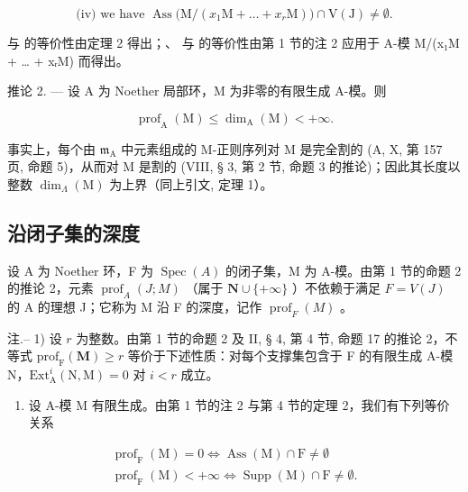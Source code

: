 \[
\text {(iv)} \text {   we have   } \operatorname{Ass} \bigl (\mathrm{M} / (x _ {1} \mathrm{M} + \ldots + x _ {r} \mathrm{M}) \bigr) \cap \mathrm{V} (\mathrm{J}) \neq \emptyset .
\]

 与 的等价性由定理 2 得出；、 与 的等价性由第 1 节的注 2 应用于 A-模 M/(x₁M + \ldots{} + xᵣM) 而得出。

推论 2. --- 设 A 为 Noether 局部环，M 为非零的有限生成 A-模。则

\[
\operatorname{prof} _ {\mathrm{A}} (\mathrm{M}) \leqslant \dim_ {\mathrm{A}} (\mathrm{M}) <   + \infty .
\]

事实上，每个由 \(\mathfrak{m}_{\mathrm{A}}\) 中元素组成的 M-正则序列对 M 是完全割的 (A, X, 第 157 页, 命题 5)，从而对 M 是割的 (VIII, § 3, 第 2 节, 命题 3 的推论)；因此其长度以整数 \(\dim_{\Lambda}(\mathrm{M})\) 为上界（同上引文, 定理 1）。

\subsection{沿闭子集的深度}

设 A 为 Noether 环，F 为 \(\operatorname{Spec}(A)\) 的闭子集，M 为 A-模。由第 1 节的命题 2 的推论 2，元素 \(\operatorname{prof}_{A}(J;M)\) （属于 \(\mathbf{N} \cup \{+\infty\}\) ）不依赖于满足 \(F = V(J)\) 的 A 的理想 J；它称为 M 沿 F 的深度，记作 \(\operatorname{prof}_{F}(M)\) 。

注.-- 1) 设 \(r\) 为整数。由第 1 节的命题 2 及 II, § 4, 第 4 节, 命题 17 的推论 2，不等式 \(\mathrm{prof}_{\mathrm{F}}(\mathbf{M}) \geqslant r\) 等价于下述性质：对每个支撑集包含于 F 的有限生成 A-模 N，\(\mathrm{Ext}_{\mathrm{A}}^{i}(\mathrm{N},\mathrm{M}) = 0\) 对 \(i < r\) 成立。

\begin{enumerate}
\def\labelenumi{\arabic{enumi})}
\setcounter{enumi}{1}
\tightlist
\item
  设 A-模 M 有限生成。由第 1 节的注 2 与第 4 节的定理 2，我们有下列等价关系
\end{enumerate}

\[
\begin{array}{c} \operatorname{prof} _ {\mathrm{F}} (\mathrm{M}) = 0 \Longleftrightarrow \operatorname{Ass} (\mathrm{M}) \cap \mathrm{F} \neq \emptyset \\ \operatorname{prof} _ {\mathrm{F}} (\mathrm{M}) <   + \infty \Longleftrightarrow \operatorname{Supp} (\mathrm{M}) \cap \mathrm{F} \neq \emptyset . \end{array}
\]

